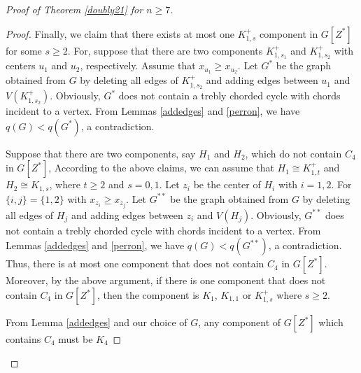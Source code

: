 \documentclass[12pt]{article}
\begin{document}
\begin{proof}[Proof of Theorem \ref{doubly21} for $n\ge 7$]
\begin{proof}


Finally, we claim that there exists at most one $K_{1,s}^+$ component in $G[Z^*]$ for some $s\ge 2$.
For, suppose that there are two components $K_{1,s_1}^+$ and $K_{1,s_2}^+$ with centers  $u_1$ and $u_2$, respectively.  Assume that $x_{u_1}\ge x_{u_2}$.
Let $G^*$ be the graph obtained from $G$ by deleting all edges of $K_{1,s_2}^+$ and adding edges between $u_1$ and $V(K_{1,s_2}^+)$.
Obviously, $G^*$ does not contain a trebly chorded cycle with chords incident to a vertex.
From Lemmas \ref{addedges} and \ref{perron}, we have $q(G)<q(G^*)$, a contradiction.

Suppose that there are two components, say $H_1$ and $H_2$,  which do not contain $C_4$ in $G[Z^*]$,
According to the above claims, we can assume that $H_1\cong K_{1,t}^+$ and $H_2\cong K_{1,s}$, where $t\ge 2$ and $s=0,1$. Let $z_i$ be the center of $H_i$ with $i=1,2$.  For $\{i,j\}=\{1,2\}$ with $x_{z_i}\ge x_{z_j}$.
Let $G^{**}$ be the graph obtained from $G$ by deleting all edges of $H_j$ and adding edges between $z_i$ and $V(H_j)$.
Obviously, $G^{**}$ does not contain a trebly chorded cycle with chords incident to a vertex.
From Lemmas \ref{addedges} and \ref{perron}, we have $q(G)<q(G^{**})$, a contradiction.
Thus,  there is at most one component that does not contain $C_4$ in $G[Z^*]$. Moreover,
by the above argument, if there is  one component that does not contain $C_4$ in $G[Z^*]$, then the component is $K_1$, $K_{1,1}$ or $K_{1,s}^+$ where $s\ge 2$.

From Lemma \ref{addedges} and our choice of $G$,  any  component of $G[Z^*]$ which contains $C_4$ must be  $K_4$
%
%
\end{proof}




\end{proof}
\end{document}
